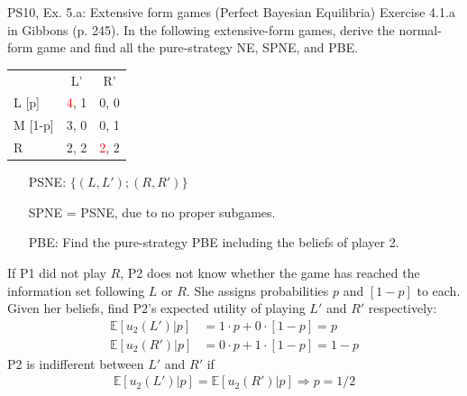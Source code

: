 \begin{frame}{PS10, Ex. 5.a: Extensive form games (Perfect Bayesian Equilibria)}
    Exercise 4.1.a in Gibbons (p. 245). In the following extensive-form games, derive the normal-form game and find all the pure-strategy NE, SPNE, and PBE.
    \vspace{-8pt}
    \begin{multicols}{2}
      \begin{table}
        \begin{tabular}{l|c|c|}
          \multicolumn{1}{c}{} & \multicolumn{1}{c}{L'} & \multicolumn{1}{c}{R'} \\\cline{2-3}
          L [p]   & \textcolor{red}{4}, \color{blue}1 & 0, 0 \\\cline{2-3}
          M [1-p] & 3, 0 & 0, \color{blue}1 \\\cline{2-3}
          R       & 2, \color{blue}2 & \textcolor{red}{2}, \color{blue}2 \\\cline{2-3}
        \end{tabular}
      \end{table} \vspace{-10pt}
      \begin{itemize}
        \item[PSNE:] $\{(L,L');(R,R')\}$
        \item[SPNE =] PSNE, due to no proper subgames.
        \item[PBE:] Find the pure-strategy PBE including the beliefs of player 2.
      \end{itemize} \vspace{-8pt}
      If P1 did not play $R$, P2 does not know whether the game has reached the information set following $L$ or $R$. She assigns probabilities $p$ and $[1-p]$ to each.\\\vspace{2pt}
      Given her beliefs, find P2's expected utility of playing $L'$ and $R'$ respectively: \vspace{-8pt}
      \begin{align*}
        \mathbb{E}[u_2(L')|p]&=1\cdot p+0\cdot[1-p]=p\\
        \mathbb{E}[u_2(R')|p]&=0\cdot p+1\cdot[1-p]=1-p
      \end{align*}
      P2 is indifferent between $L'$ and $R'$ if \vspace{-8pt}
      \begin{align*}
        \mathbb{E}[u_2(L')|p]=\mathbb{E}[u_2(R')|p]\Rightarrow p=1/2
      \end{align*}

\end{multicols}
\end{frame}

